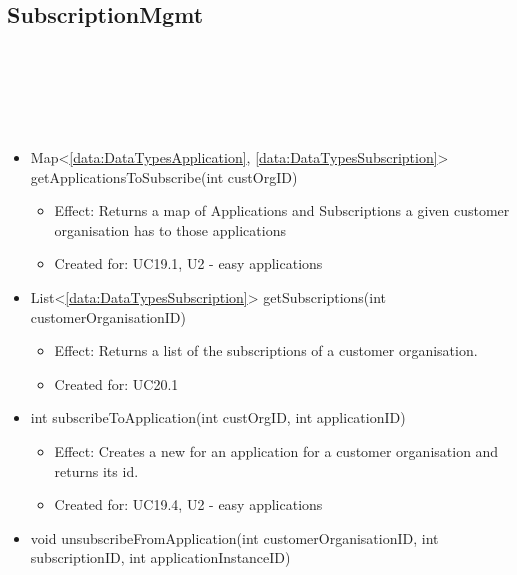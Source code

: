   \subsection{SubscriptionMgmt}\label{int:OnlineServiceOnlineServiceCustomerOrganisationFacadeSubscriptionMgmt}
    \begin{description}
      \item[Provided by:] \iconcomponent{}~
      \item[Required by:] \iconcomponent{}~
      \item[Operations:] ~
    \begin{itemize}[noitemsep,nolistsep,leftmargin=-.25cm]
      \item \textsf{Map\textless{}\ref{data:DataTypesApplication}, \ref{data:DataTypesSubscription}\textgreater{} getApplicationsToSubscribe(int custOrgID)}
        \begin{itemize}[noitemsep,nolistsep]
           \item Effect: Returns a map of Applications and Subscriptions a given customer organisation has to those applications
\item Created for: UC19.1, U2 - easy applications
        \end{itemize}
      \item \textsf{List\textless{}\ref{data:DataTypesSubscription}\textgreater{} getSubscriptions(int customerOrganisationID)}
        \begin{itemize}[noitemsep,nolistsep]
           \item Effect: Returns a list of the subscriptions of a customer organisation.
\item Created for: UC20.1
        \end{itemize}
      \item \textsf{int subscribeToApplication(int custOrgID, int applicationID)}
        \begin{itemize}[noitemsep,nolistsep]
           \item Effect: Creates a new  for an application for a customer organisation and returns its id.
\item Created for: UC19.4, U2 - easy applications
        \end{itemize}
      \item \textsf{void unsubscribeFromApplication(int customerOrganisationID, int subscriptionID, int applicationInstanceID)}

\end{itemize}
\end{description}
